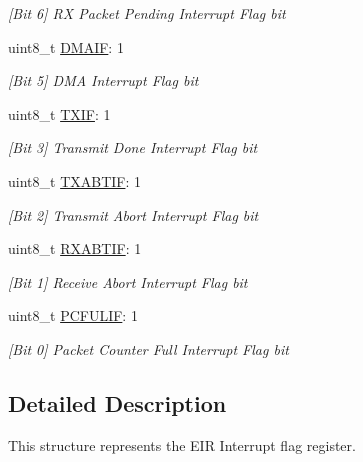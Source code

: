 \begin{DoxyCompactItemize}
\begin{DoxyCompactList}\small\item\em \mbox{[}Bit 6\mbox{]} RX Packet Pending Interrupt Flag bit \end{DoxyCompactList}\item 
uint8\+\_\+t \mbox{\hyperlink{structinterrupt_flags__t_ac03ab9621d33c1e860f64dbcf0fa2a3e}{D\+M\+A\+IF}}\+: 1
\begin{DoxyCompactList}\small\item\em \mbox{[}Bit 5\mbox{]} D\+MA Interrupt Flag bit \end{DoxyCompactList}\item 
uint8\+\_\+t \mbox{\hyperlink{structinterrupt_flags__t_a8ac6b64dff7b25ddf36cea5543329e56}{T\+X\+IF}}\+: 1
\begin{DoxyCompactList}\small\item\em \mbox{[}Bit 3\mbox{]} Transmit Done Interrupt Flag bit \end{DoxyCompactList}\item 
uint8\+\_\+t \mbox{\hyperlink{structinterrupt_flags__t_aef79dc4f43ab3844327f963cedfc3a57}{T\+X\+A\+B\+T\+IF}}\+: 1
\begin{DoxyCompactList}\small\item\em \mbox{[}Bit 2\mbox{]} Transmit Abort Interrupt Flag bit \end{DoxyCompactList}\item 
uint8\+\_\+t \mbox{\hyperlink{structinterrupt_flags__t_adfd2bd74bfbf9d086ac5364f2c2bc420}{R\+X\+A\+B\+T\+IF}}\+: 1
\begin{DoxyCompactList}\small\item\em \mbox{[}Bit 1\mbox{]} Receive Abort Interrupt Flag bit \end{DoxyCompactList}\item 
uint8\+\_\+t \mbox{\hyperlink{structinterrupt_flags__t_a54ca36edd15d3a43ea58c44c9b4632d1}{P\+C\+F\+U\+L\+IF}}\+: 1
\begin{DoxyCompactList}\small\item\em \mbox{[}Bit 0\mbox{]} Packet Counter Full Interrupt Flag bit \end{DoxyCompactList}\end{DoxyCompactItemize}


\subsection{Detailed Description}
This structure represents the E\+IR Interrupt flag register. 


